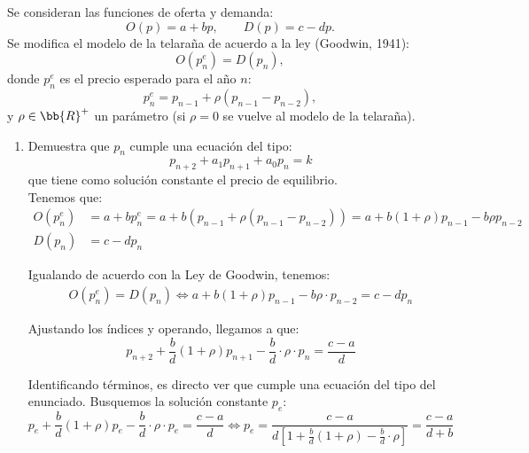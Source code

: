\begin{ejercicio}
    Se consideran las funciones de oferta y demanda:
    \begin{equation*}
        O(p) = a + b p, \qquad D(p) = c - d p.
    \end{equation*}
    Se modifica el modelo de la telaraña de acuerdo a la ley (Goodwin, 1941):
    \begin{equation*}
        O(p_n^e) = D(p_n),
    \end{equation*}
    donde $p_n^e$ es el precio esperado para el año $n$:
    \begin{equation*}
        p_n^e = p_{n-1} + \rho(p_{n-1} - p_{n-2}),
    \end{equation*}
    y $\rho\in \bb{R}^+$ un parámetro (si $\rho = 0$ se vuelve al modelo de la telaraña).
    \begin{enumerate}
        \item Demuestra que $p_n$ cumple una ecuación del tipo:
        \begin{equation*}
            p_{n+2} + a_1 p_{n+1} + a_0 p_n = k
        \end{equation*}
        que tiene como solución constante el precio de equilibrio.\\

        Tenemos que:
        \begin{align*}
            O(p_n^e) &= a+bp_n^e = a+b\left(p_{n-1} + \rho(p_{n-1} - p_{n-2})\right)
            =a+b(1+\rho)p_{n-1} -b\rho p_{n-2} \\
            D(p_n) &= c-dp_n
        \end{align*}

        Igualando de acuerdo con la Ley de Goodwin, tenemos:
        \begin{align*}
            O(p_n^e)=D(p_n)\Longleftrightarrow a+b(1+\rho)p_{n-1} -b\rho\cdot p_{n-2} = c-dp_n
        \end{align*}

        Ajustando los índices y operando, llegamos a que:
        \begin{equation*}
            p_{n+2} +\frac{b}{d}(1+\rho)p_{n+1}-\frac{b}{d}\cdot \rho\cdot p_{n} = \frac{c-a}{d}
        \end{equation*}

        Identificando términos, es directo ver que cumple una ecuación del tipo del enunciado. Busquemos la solución constante $p_e$:
        \begin{equation*}
            p_{e} +\frac{b}{d}(1+\rho)p_{e}-\frac{b}{d}\cdot \rho\cdot p_{e} = \frac{c-a}{d}
            \Longleftrightarrow
            p_e = \dfrac{c-a}{d\left[1+\frac{b}{d}(1+\rho)-\frac{b}{d}\cdot \rho\right]}
            = \dfrac{c-a}{d+b}
        \end{equation*}


\end{enumerate}
\end{ejercicio}
